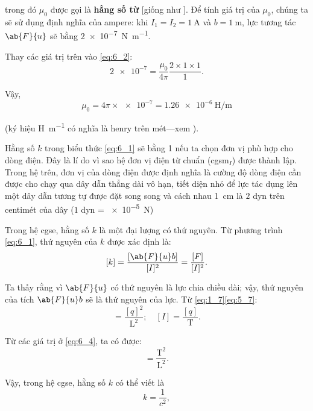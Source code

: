 \noindent
trong đó $\mu_0$ được gọi là \textbf{hằng số từ} [giống như ]. Để tính giá trị của $\mu_0$, chúng ta sẽ sử dụng định nghĩa của ampere: khi $I_1=I_2=\SI{1}{\ampere}$ và $b=\SI{1}{\metre}$, lực tương tác $\ab{F}{u}$ sẽ bằng \SI{2e-7}{\newton\per\metre}.

Thay các giá trị trên vào \eqref{eq:6_2}:
\begin{equation*}
    \num{2e-7} = \frac{\mu_0}{4\pi} \frac{2\times 1\times 1}{1}.
\end{equation*}

\noindent
Vậy,
\begin{equation}\label{eq:6_3}
    \mu_0 = 4 \pi \times \num{e-7} = \SI{1.26e-6}{\henry\per\metre}
\end{equation}

\noindent
(ký hiệu \si{\henry\per\metre} có nghĩa là henry trên mét---xem ).

Hằng số $k$ trong biểu thức \eqref{eq:6_1} sẽ bằng 1 nếu ta chọn đơn vị phù hợp cho dòng điện. Đây là lí do vì sao hệ đơn vị điện từ chuẩn (cgsm$_I$) được thành lập. Trong hệ trên, đơn vị của dòng điện được định nghĩa là cường độ dòng điện cần được cho chạy qua dây dẫn thẳng dài vô hạn, tiết diện nhỏ để lực tác dụng lên một dây dẫn tương tự được đặt song song và cách nhau \SI{1}{\centi\metre} là $2$ dyn trên centimét của dây ($1$ dyn = \SI{e-5}{\newton})
 
Trong hệ cgse, hằng số $k$ là một đại lượng có thứ nguyên. Từ phương trình \eqref{eq:6_1}, thứ nguyên của $k$ được xác định là:
\begin{equation}\label{eq:6_4}
    [k] = \frac{[\ab{F}{u} b]}{[I]^2} = \frac{[F]}{[I]^2}.
\end{equation}

\noindent
Ta thấy rằng vì $\ab{F}{u}$ có thứ nguyên là lực chia chiều dài; vậy, thứ nguyên của tích $\ab{F}{u}b$ sẽ là thứ nguyên của lực. Từ \eqref{eq:1_7}\eqref{eq:5_7}:
\begin{equation*}
    [F] = \frac{[q]^2}{\text{L}^2};\quad [I] = \frac{[q]}{\text{T}}.
\end{equation*}

\noindent
Từ các giá trị ở \eqref{eq:6_4}, ta có được:
\begin{equation*}
    [k] = \frac{\text{T}^2}{\text{L}^2}.
\end{equation*}

\noindent
Vậy, trong hệ cgse, hằng số $k$ có thể viết là
\begin{equation}\label{eq:6_5}
    k = \frac{1}{c^2},
\end{equation}

